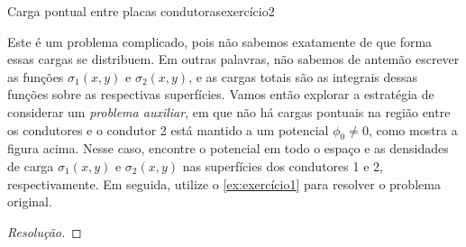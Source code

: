 \begin{exercício}{Carga pontual entre placas condutoras}{exercício2}
\begin{center}
    \end{center}
    Este é um problema complicado, pois não sabemos exatamente de que forma essas cargas se distribuem. Em outras palavras, não sabemos de antemão escrever as funções \(\sigma_1(x,y)\) e \(\sigma_2(x,y)\), e as cargas totais são as integrais dessas funções sobre as respectivas superfícies. Vamos então explorar a estratégia de considerar um \emph{problema auxiliar}, em que não há cargas pontuais na região entre os condutores e o condutor 2 está mantido a um potencial \(\phi_0 \neq 0\), como mostra a figura acima. Nesse caso, encontre o potencial em todo o espaço e as densidades de carga \(\sigma_1(x,y)\) e \(\sigma_2(x,y)\) nas superfícies dos condutores 1 e 2, respectivamente. Em seguida, utilize o \cref{ex:exercício1} para resolver o problema original.
\end{exercício}
\begin{proof}[Resolução]

\end{proof}
